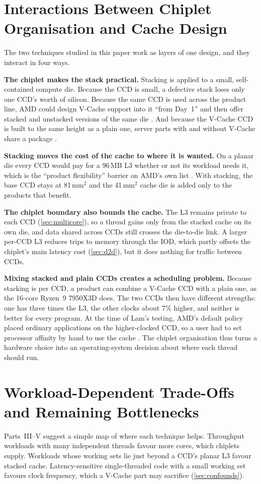\section{Interactions Between Chiplet Organisation and Cache Design}
\label{sec:interactions}
The two techniques studied in this paper work as layers of one design, and they interact in four ways.

\textbf{The chiplet makes the stack practical.} Stacking is applied to a small, self-contained compute die. Because the CCD is small, a defective stack loses only one CCD's worth of silicon. Because the same CCD is used across the product line, AMD could design V-Cache support into it ``from Day~1'' and then offer stacked and unstacked versions of the same die \cite[slide~10]{wuu2022vcache}. And because the V-Cache CCD is built to the same height as a plain one, server parts with and without V-Cache share a package \cite[slide~17]{wuu2022vcache}.

\textbf{Stacking moves the cost of the cache to where it is wanted.} On a planar die every CCD would pay for a 96\,MB L3 whether or not its workload needs it, which is the ``product flexibility'' barrier on AMD's own list \cite[slide~6]{wuu2022vcache}. With stacking, the base CCD stays at 81\,mm$^2$ and the 41\,mm$^2$ cache die is added only to the products that benefit.

\textbf{The chiplet boundary also bounds the cache.} The L3 remains private to each CCD (\cref{sec:multicore}), so a thread gains only from the stacked cache on its own die, and data shared across CCDs still crosses the die-to-die link. A larger per-CCD L3 reduces trips to memory through the IOD, which partly offsets the chiplet's main latency cost (\cref{sec:d2d}), but it does nothing for traffic between CCDs.

\textbf{Mixing stacked and plain CCDs creates a scheduling problem.} Because stacking is per CCD, a product can combine a V-Cache CCD with a plain one, as the 16-core Ryzen~9 7950X3D does. The two CCDs then have different strengths: one has three times the L3, the other clocks about 7\% higher, and neither is better for every program. At the time of Lam's testing, AMD's default policy placed ordinary applications on the higher-clocked CCD, so a user had to set processor affinity by hand to use the cache \cite{lamAMDs7950X3DZen2023}. The chiplet organisation thus turns a hardware choice into an operating-system decision about where each thread should run.

\section{Workload-Dependent Trade-Offs and Remaining Bottlenecks}
\label{sec:remaining-bottlenecks}
Parts~III--V suggest a simple map of where each technique helps. Throughput workloads with many independent threads favour more cores, which chiplets supply. Workloads whose working sets lie just beyond a CCD's planar L3 favour stacked cache. Latency-sensitive single-threaded code with a small working set favours clock frequency, which a V-Cache part may sacrifice (\cref{sec:confounds}).

